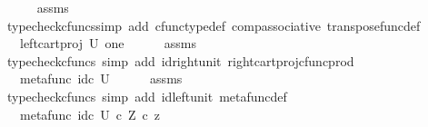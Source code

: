 \begin{isabellebody}
\ \ \ \ \isamarkupfalse%
\ assms\ \isamarkupfalse%
\ {\isacharparenleft}{\kern0pt}typecheck{\isacharunderscore}{\kern0pt}cfuncs{\isacharcomma}{\kern0pt}simp\ add{\isacharcolon}{\kern0pt}\ cfunc{\isacharunderscore}{\kern0pt}type{\isacharunderscore}{\kern0pt}def\ comp{\isacharunderscore}{\kern0pt}associative\ transpose{\isacharunderscore}{\kern0pt}func{\isacharunderscore}{\kern0pt}def{\isacharparenright}{\kern0pt}\isanewline
\ \ \isamarkupfalse%
\ \isamarkupfalse%
\ {\isachardoublequoteopen}{\isachardot}{\kern0pt}{\isachardot}{\kern0pt}{\isachardot}{\kern0pt}\ {\isacharequal}{\kern0pt}\ {\isacharparenleft}{\kern0pt}left{\isacharunderscore}{\kern0pt}cart{\isacharunderscore}{\kern0pt}proj\ {\isacharparenleft}{\kern0pt}U{\isacharparenright}{\kern0pt}\ one{\isacharparenright}{\kern0pt}\isactrlsup {\isasymsharp}{\isachardoublequoteclose}\isanewline
\ \ \ \ \isamarkupfalse%
\ assms\ \isamarkupfalse%
\ {\isacharparenleft}{\kern0pt}typecheck{\isacharunderscore}{\kern0pt}cfuncs{\isacharcomma}{\kern0pt}\ simp\ add{\isacharcolon}{\kern0pt}\ id{\isacharunderscore}{\kern0pt}right{\isacharunderscore}{\kern0pt}unit{}\ right{\isacharunderscore}{\kern0pt}cart{\isacharunderscore}{\kern0pt}proj{\isacharunderscore}{\kern0pt}cfunc{\isacharunderscore}{\kern0pt}prod{\isacharparenright}{\kern0pt}\isanewline
\ \ \isamarkupfalse%
\ \isamarkupfalse%
\ {\isachardoublequoteopen}{\isachardot}{\kern0pt}{\isachardot}{\kern0pt}{\isachardot}{\kern0pt}\ {\isacharequal}{\kern0pt}\ {\isacharparenleft}{\kern0pt}metafunc\ {\isacharparenleft}{\kern0pt}id\isactrlsub c\ U{\isacharparenright}{\kern0pt}{\isacharparenright}{\kern0pt}{\isachardoublequoteclose}\isanewline
\ \ \ \ \isamarkupfalse%
\ assms\ \isamarkupfalse%
\ {\isacharparenleft}{\kern0pt}typecheck{\isacharunderscore}{\kern0pt}cfuncs{\isacharcomma}{\kern0pt}\ simp\ add{\isacharcolon}{\kern0pt}\ id{\isacharunderscore}{\kern0pt}left{\isacharunderscore}{\kern0pt}unit{}\ metafunc{\isacharunderscore}{\kern0pt}def{}{\isacharparenright}{\kern0pt}\isanewline
\ \ \isamarkupfalse%
\ \isamarkupfalse%
\ {\isachardoublequoteopen}{\isachardot}{\kern0pt}{\isachardot}{\kern0pt}{\isachardot}{\kern0pt}\ {\isacharequal}{\kern0pt}\ {\isacharparenleft}{\kern0pt}metafunc\ {\isacharparenleft}{\kern0pt}id\isactrlsub c\ U{\isacharparenright}{\kern0pt}\ {\isasymcirc}\isactrlsub c\ {\isasymbeta}\isactrlbsub Z\isactrlesub {\isacharparenright}{\kern0pt}\ {\isasymcirc}\isactrlsub c\ z{\isachardoublequoteclose}\isanewline

\end{isabellebody}
